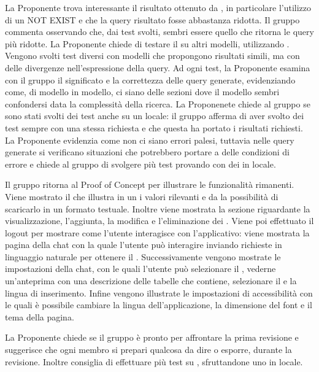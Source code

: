 \par La Proponente trova interessante il risultato ottenuto da , in particolare l'utilizzo di un NOT EXIST e che la query risultato fosse abbastanza ridotta. Il gruppo commenta osservando che, dai test svolti,  sembri essere quello che ritorna le query più ridotte.
La Proponente chiede di testare il  su altri modelli, utilizzando . Vengono svolti test diversi con modelli che propongono risultati simili, ma con delle divergenze nell'espressione della query. Ad ogni test, la Proponente esamina con il gruppo il significato e la correttezza delle query generate, evidenziando come, di modello in modello, ci siano delle sezioni dove il modello sembri confondersi data la complessità della ricerca.
La Proponenete chiede al gruppo se sono stati svolti dei test anche su un  locale: il gruppo afferma di aver svolto dei test sempre con una stessa richiesta e che questa ha portato i risultati richiesti.
La Proponente evidenzia come non ci siano errori palesi, tuttavia nelle query generate si verificano situazioni che potrebbero portare a delle condizioni di errore e chiede al gruppo di svolgere più test provando con dei  in locale.

\par Il gruppo ritorna al Proof of Concept per illustrare le funzionalità rimanenti. Viene mostrato il  che illustra in un  i valori rilevanti e da la possibilità di scaricarlo in un formato testuale. Inoltre viene mostrata la sezione riguardante la visualizzazione, l'aggiunta, la modifica e l'eliminazione dei .
Viene poi effettuato il logout per mostrare come l'utente interagisce con l'applicativo: viene mostrata la pagina della chat con la quale l'utente può interagire inviando richieste in linguaggio naturale per ottenere il . Successivamente vengono mostrate le impostazioni della chat, con le quali l'utente può selezionare il , vederne un'anteprima con una descrizione delle tabelle che contiene, selezionare il  e la lingua di inserimento.
Infine vengono illustrate le impostazioni di accessibilità con le quali è possibile cambiare la lingua dell'applicazione, la dimensione del font e il tema della pagina.

\par La Proponente chiede se il gruppo è pronto per affrontare la prima revisione e suggerisce che ogni membro si prepari qualcosa da dire o esporre, durante la revisione. Inoltre consiglia di effettuare più test su , sfruttandone uno in locale.


